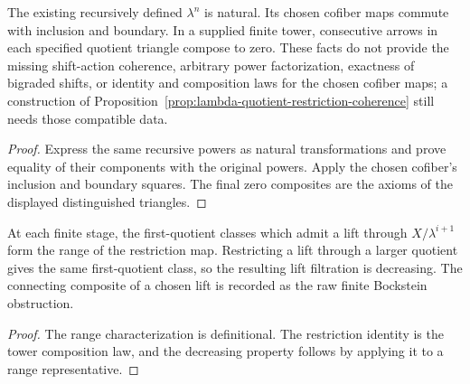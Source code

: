 \begin{proposition}
  \label{prop:finite-lambda-quotient-local-laws}
  \leanok
  The existing recursively defined $\lambda^n$ is natural. Its chosen
  cofiber maps commute with inclusion and boundary. In a supplied finite
  tower, consecutive arrows in each specified quotient triangle compose
  to zero. These facts do not provide the missing shift-action coherence,
  arbitrary power factorization, exactness of bigraded shifts, or identity
  and composition laws for the chosen cofiber maps; a construction of
  Proposition~\ref{prop:lambda-quotient-restriction-coherence} still needs
  those compatible data.
\end{proposition}
\begin{proof}
  Express the same recursive powers as natural transformations and prove
  equality of their components with the original powers. Apply the chosen
  cofiber's inclusion and boundary squares. The final zero composites are
  the axioms of the displayed distinguished triangles.
  \leanok
\end{proof}

\begin{proposition}
  \label{prop:finite-quotient-lift-filtration}
  \leanok
  At each finite stage, the first-quotient classes which admit a lift through
  $X/\lambda^{i+1}$ form the range of the restriction map.  Restricting a
  lift through a larger quotient gives the same first-quotient class, so the
  resulting lift filtration is decreasing.  The connecting composite of a
  chosen lift is recorded as the raw finite Bockstein obstruction.
\end{proposition}
\begin{proof}
  The range characterization is definitional.  The restriction identity is
  the tower composition law, and the decreasing property follows by applying
  it to a range representative.
  \leanok
\end{proof}

